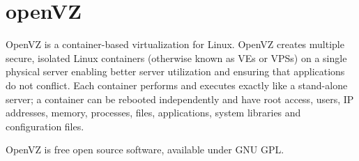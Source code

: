 \section{openVZ}
OpenVZ\cite{www-openvz} is a container-based virtualization for Linux. OpenVZ creates multiple
secure, isolated Linux containers (otherwise known as VEs or VPSs) on a single
physical server enabling better server utilization and ensuring that
applications do not conflict. Each container performs and executes exactly
like a stand-alone server; a container can be rebooted independently and have
root access, users, IP addresses, memory, processes, files, applications,
system libraries and configuration files.

OpenVZ is free open source software, available under GNU GPL. 
